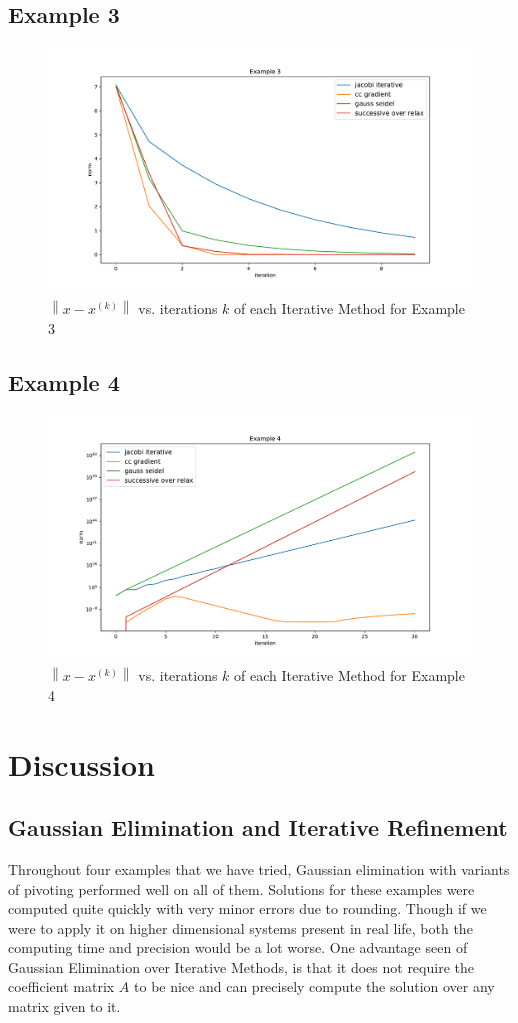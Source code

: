 \documentclass[11pt]{article}	%
\newcommand\norm[1]{\left\lVert#1\right\rVert}
\begin{document}
\subsection{Example 3}
\begin{figure}[H]
\centering
\includegraphics[width=.9\textwidth]{3}
\caption{$\norm{x - x^{(k)}}$ vs. iterations $k$ of each Iterative Method for Example 3}
\label{fig:3}
\end{figure}

\subsection{Example 4}
\begin{figure}[H]
\centering
\includegraphics[width=.9\textwidth]{4}
\caption{$\norm{x - x^{(k)}}$ vs. iterations $k$ of each Iterative Method for Example 4}
\label{fig:rk4_predictor_ab4_1}
\end{figure}

\section{Discussion}
\subsection{Gaussian Elimination and Iterative Refinement}
Throughout four examples that we have tried, Gaussian elimination with variants of pivoting performed well on all of them. Solutions for these examples were computed quite quickly with very minor errors due to rounding. Though if we were to apply it on higher dimensional systems present in real life, both the computing time and precision would be a lot worse. One advantage seen of Gaussian Elimination over Iterative Methods, is that it does not require the coefficient matrix $A$ to be nice and can precisely compute the solution over any matrix given to it.
\end{document}
